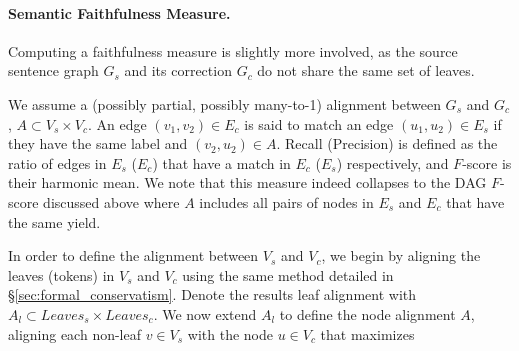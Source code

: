 \documentclass[letter,11pt]{article}
\begin{document}
\paragraph{Semantic Faithfulness Measure.} Computing a faithfulness
measure is slightly more involved, as the source sentence graph $G_s$ and its
correction $G_c$ do not share the same set of leaves.

%
%
We assume a (possibly partial, possibly many-to-1) alignment between $G_s$ and $G_c$,
$A \subset V_s \times V_c$. An edge $(v_1,v_2) \in E_c$ is said to match an edge
$(u_1,u_2) \in E_s$ if they have the same label and $(v_2,u_2) \in A$. Recall (Precision)
is defined as the ratio of edges in $E_s$ ($E_c$) that have a match in $E_c$ ($E_s$) respectively, and
$F$-score is their harmonic mean. We note that this measure indeed collapses to the
DAG $F$-score discussed above where $A$ includes all pairs of nodes in $E_s$ and $E_c$ that have
the same yield.

In order to define the alignment between $V_s$ and $V_c$, we begin by aligning the leaves
(tokens) in $V_s$ and $V_c$ using the same method detailed in \S \ref{sec:formal_conservatism}.
Denote the results leaf alignment with $A_l \subset Leaves_s \times Leaves_c$.
We now extend $A_l$ to define the node alignment $A$, aligning each non-leaf $v \in V_s$
with the node $u \in V_c$ that maximizes
\end{document}
